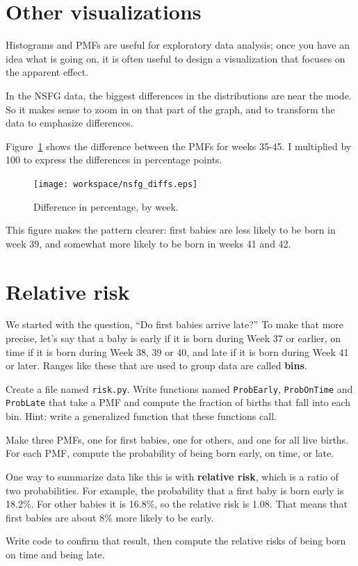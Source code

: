 \documentclass[12pt]{book}
\begin{document}
\section{Other visualizations}

Histograms and PMFs are useful for exploratory data analysis;
once you have an idea what is going on, it is often useful to
design a visualization that focuses on the apparent effect.

In the NSFG data, the biggest differences in the distributions are
near the mode.  So it makes sense to zoom in on that part of the
graph, and to transform the data to emphasize differences.

Figure~\ref{nsfg_diffs} shows the difference between the PMFs for weeks
35-45.  I multiplied by 100 to express the differences in percentage
points.

\begin{figure}
\centerline{\texttt{[image: workspace/nsfg\_diffs.eps]}}
\caption{Difference in percentage, by week.}
\label{nsfg_diffs}
\end{figure}

This figure makes the pattern clearer: first babies are
less likely to be born in week 39, and somewhat more likely
to be born in weeks 41 and 42.


\section{Relative risk}
\label{relative.risk}

We started with the question, ``Do first babies arrive late?''  To
make that more precise, let's say that a baby is early if it is born
during Week 37 or earlier, on time if it is born during Week 38, 39 or
40, and late if it is born during Week 41 or later.  Ranges like these
that are used to group data are called {\bf bins}.

\begin{ex}

Create a file named {\tt risk.py}.
Write functions named {\tt ProbEarly}, {\tt ProbOnTime} and
{\tt ProbLate} that take a PMF and compute the fraction of births
that fall into each bin.  Hint: write a generalized function
that these functions call.

Make three PMFs, one for first babies, one for others, and one for
all live births.  For each PMF, compute the probability of being
born early, on time, or late.

One way to summarize data like this is with {\bf relative risk},
which is a ratio of two probabilities.  For example, the probability
that a first baby is born early is 18.2\%.  For other babies it is
16.8\%, so the relative risk is 1.08.  That means that first babies
are about 8\% more likely to be early.

Write code to confirm that result, then compute the relative risks of
being born on time and being late.

\end{ex}
\end{document}
